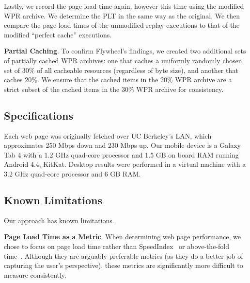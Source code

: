 Lastly, we record the page load time again, however this time using the modified WPR archive. We determine the PLT in the same way as the original. We then compare the page load times of the unmodified replay executions to that of the modified ``perfect cache'' executions.

\textbf{Partial Caching}. To confirm Flywheel's findings, we created two additional sets of partially cached WPR archives: one that caches a uniformly randomly chosen set of 30\% of all cacheable resources (regardless of byte size), and another that caches 20\%.
We ensure that the cached items in the 20\% WPR archive are a strict subset of the cached items in the 30\% WPR archive for consistency. 
\subsection{Specifications} \label{specs}
Each web page was originally fetched over UC Berkeley's LAN, which approximates 250 Mbps down and 230 Mbps up.
Our mobile device is a Galaxy Tab 4 with a 1.2 GHz quad-core processor and 1.5 GB on board RAM running Android 4.4, KitKat. Desktop results were performed in a virtual machine with a 3.2 GHz quad-core processor and 6 GB RAM.
\subsection{Known Limitations}  \label{known_limitations}
Our approach has known limitations.

\textbf{Page Load Time as a Metric}. When determining web page performance, we chose to focus on page load time rather than SpeedIndex~\cite{speed-index} or above-the-fold time~\cite{above-the-fold}.
Although they are arguably preferable metrics (as they do a better job of capturing the user's perspective), these metrics are significantly more difficult to measure consistently.

